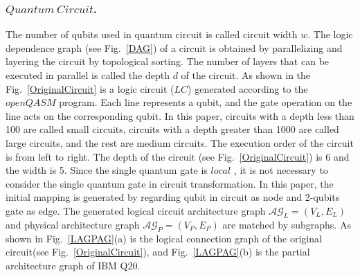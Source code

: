 \documentclass[runningheads]{llncs}
\begin{document}
 \subsubsection{$Quantum \ Circuit$.}
The number of qubits used in quantum circuit is called circuit width $w$. 
The logic dependence graph (see Fig.~\ref{DAG}) of a circuit is obtained by parallelizing 
and layering the circuit by topological sorting. The number of layers that 
can be executed in parallel is called the depth $d$ of the circuit.
As shown in the Fig.~\ref{OriginalCircuit} is a logic circuit ($LC$) generated according to the $openQASM$ program.
Each line represents a qubit, and the gate operation on the line acts on the corresponding qubit.
In this paper, circuits with a depth less than 100 are called small circuits, 
circuits with a depth greater than 1000 are called large circuits, 
and the rest are medium circuits.
The execution order of the circuit is from left to right. 
The depth of the circuit (see Fig.~\ref{OriginalCircuit}) is 6 and the width is 5.
Since the single quantum gate is $local$ \cite{2013Optimization}, 
it is not necessary to consider the single quantum gate in circuit transformation. 
In this paper, the initial mapping is generated by regarding qubit in circuit 
as node and 2-qubits gate as edge. 
The generated logical circuit architecture graph $\mathcal{AG}_{L}=(V_{L},E_{L})$ 
and physical architecture graph $\mathcal{AG}_{P}=(V_{P},E_{P})$ are matched by subgraphs. 
As shown in Fig.~\ref{LAGPAG}(a) is the logical connection graph 
of the original circuit(see Fig.~\ref{OriginalCircuit}),
and Fig.~\ref{LAGPAG}(b) is the partial architecture graph of IBM Q20.
\end{document}
